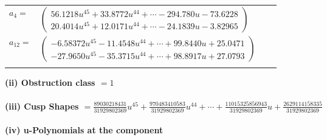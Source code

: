 \documentclass[1p]{elsarticle_modified}
\theoremstyle{definition}
\begin{document}
\begin{tabular}{m{7pt} m{180pt} m{7pt} m{180pt} }
\flushright $a_{4}=$&$\begin{pmatrix}56.1218 u^{45}+33.8772 u^{44}+\cdots-294.780 u-73.6228\\20.4014 u^{45}+12.0171 u^{44}+\cdots-24.1839 u-3.82965\end{pmatrix}$ \\
\flushright $a_{12}=$&$\begin{pmatrix}-6.58372 u^{45}-11.4548 u^{44}+\cdots+99.8440 u+25.0471\\-27.9650 u^{45}-35.3715 u^{44}+\cdots+98.8917 u+27.0793\end{pmatrix}$\\&\end{tabular}
\flushleft \textbf{(ii) Obstruction class $= 1$}\\~\\
\flushleft \textbf{(iii) Cusp Shapes $= \frac{89030218431}{31929802369} u^{45}+\frac{970483410583}{31929802369} u^{44}+\cdots+\frac{11015325856943}{31929802369} u+\frac{2629114158335}{31929802369}$}\\~\\
\newpage\renewcommand{\arraystretch}{1}
\flushleft \textbf{(iv) u-Polynomials at the component}\newline \\
\end{document}
